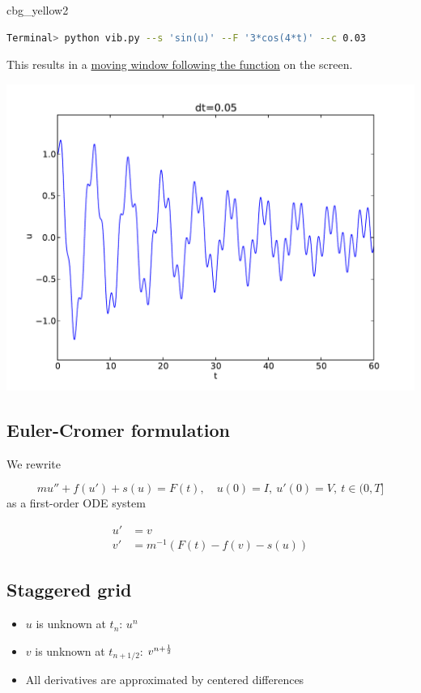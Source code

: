 \documentclass[%
oneside,                 %
final,                   %
10pt]{article}
\newenvironment{_cod_tight}[1]{
   \def\FrameCommand{\colorbox{#1}}
   \FrameRule0.6pt\MakeFramed {\FrameRestore}\vskip3mm}
   {\vskip0mm\endMakeFramed}
\newenvironment{cod}[1]{
\bgroup\rmfamily
\fboxsep=0mm\relax
\begin{_cod_tight}{#1}
\list{}{\parsep=-2mm\parskip=0mm\topsep=0pt\leftmargin=2mm
\rightmargin=2\leftmargin\leftmargin=4pt\relax}
\item\relax}
{\endlist\end{_cod_tight}\egroup}
\begin{document}
\begin{cod}{cbg_yellow2}\begin{lstlisting}[language=bash,style=simple,xleftmargin=2mm]
Terminal> python vib.py --s 'sin(u)' --F '3*cos(4*t)' --c 0.03
\end{lstlisting}\end{cod}
\noindent
This results in a \href{{http://tinyurl.com/opdfafk/pub/mov-vib/vib_generalized_dt0.05/index.html}}{moving window following the function} on the screen.



\centerline{\includegraphics[width=0.9\linewidth]{fig-vib/vib_gen_demo.pdf}}



\subsection*{Euler-Cromer formulation}

We rewrite

\[
mu'' + f(u') + s(u) = F(t),\quad u(0)=I,\ u'(0)=V,\ t\in (0,T]
\]
as a first-order ODE system

\begin{align*}
u' &= v
\\ 
v' &= m^{-1}\left(F(t) - f(v) - s(u)\right)
\end{align*}

\subsection*{Staggered grid}

\begin{itemize}
 \item $u$ is unknown at $t_n$: $u^n$

 \item $v$ is unknown at $t_{n+1/2}$: $v^{n+\half}$

 \item All derivatives are approximated by centered differences
\end{itemize}
\end{document}
